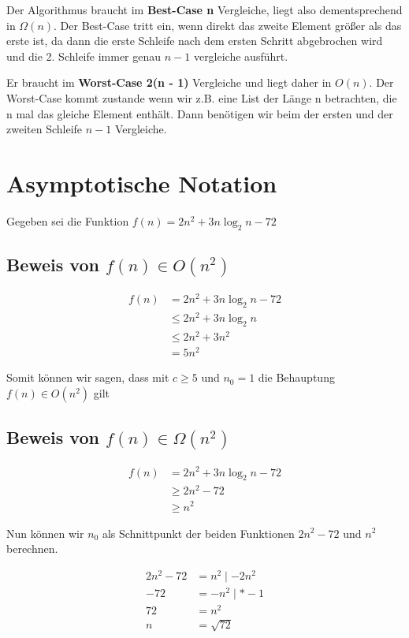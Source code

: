 \documentclass{article}
\begin{document}
Der Algorithmus braucht im \textbf{Best-Case n} Vergleiche, liegt also dementsprechend in $\Omega(n)$. Der Best-Case tritt ein,
wenn direkt das zweite Element größer als das erste ist, da dann die erste Schleife nach dem ersten Schritt abgebrochen wird und
die 2. Schleife immer genau $n - 1$ vergleiche ausführt.

Er braucht im \textbf{Worst-Case 2(n - 1)} Vergleiche und liegt daher in $O(n)$. Der Worst-Case kommt zustande wenn wir z.B. eine List der
Länge n betrachten, die n mal das gleiche Element enthält. Dann benötigen wir beim der ersten und der zweiten Schleife $n - 1$ Vergleiche.

\section{Asymptotische Notation}

Gegeben sei die Funktion $f(n) = 2n^2 + 3n\log_2n - 72$

\subsection{Beweis von $f(n) \in O(n^2)$}

\begin{align*}
	f(n) & = 2n^2 + 3n\log_2n - 72 \\
	     & \leq 2n^2 + 3n\log_2n   \\
	     & \leq 2n^2 + 3n^2        \\
	     & = 5n^2
\end{align*}

Somit können wir sagen, dass mit $c \geq 5$ und $n_0 = 1$ die Behauptung $f(n) \in O(n^2)$ gilt

\subsection{Beweis von $f(n) \in \Omega(n^2)$}

\begin{align*}
	f(n) & = 2n^2 + 3n\log_2n - 72 \\
		 & \geq 2n^2 - 72 \\
	     & \geq n^2
\end{align*}

Nun können wir $n_0$ als Schnittpunkt der beiden Funktionen $2n^2 - 72$ und $n^2$ berechnen.

\begin{align*}
	2n^2 - 72 & = n^2 \mid - 2n^2  \\
		 - 72 & = -n^2 \mid * -1 \\
		   72 & = n^2 \\
		    n & = \sqrt{72}
\end{align*}
\end{document}
